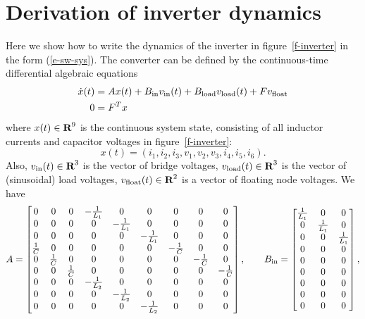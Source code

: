 \documentclass[12pt]{article}
\newcommand{\reals}{{\mbox{\bf R}}}
\begin{document}
\section{Derivation of inverter dynamics}
\label{s-inverter-derivation}
Here we show how to write the dynamics of the inverter in figure~\ref{f-inverter} 
in the form (\ref{e-sw-sys}).
The converter can be defined by the continuous-time differential algebraic equations
\begin{align*}
\dot x(t) &= A x(t) + B_{\rm in} v_{\rm in}(t)
+ B_{\rm load} v_{\rm load}(t) + Fv_{\rm float}
\\
0 &= F^T x
\end{align*}
where $x(t)\in\reals^9$ is the continuous system state,
consisting of all inductor currents and capacitor voltages in 
figure~\ref{f-inverter}:
\[
x(t) = (
i_1, i_2, i_3, v_1, v_2, v_3, i_4, i_5, i_6 ).
\]
Also, $v_{\rm in}(t)\in\reals^3$ is the vector of bridge voltages,
$v_{\rm load}(t)\in\reals^3$ is the vector of (sinusoidal) load voltages,
$v_{\rm float}(t) \in \reals^2$ is a vector of floating node voltages.
We have
\[
A = 
\begin{bmatrix} 
0 & 0 & 0 & -\frac1{L_1} & 0 & 0 & 0 & 0 & 0 \\
0 & 0 & 0 & 0 & -\frac1{L_1} & 0 & 0 & 0 & 0 \\
0 & 0 & 0 & 0 & 0 & -\frac1{L_1} & 0 & 0 & 0 \\
\frac1C & 0 & 0 & 0 & 0 & 0 & -\frac1C & 0 & 0 \\
0 & \frac1C & 0 & 0 & 0 & 0 & 0 & -\frac1C & 0 \\
0 & 0 & \frac1C & 0 & 0 & 0 & 0 & 0 & -\frac1C \\
0 & 0 & 0 & -\frac1{L_2} & 0 & 0 & 0 & 0 & 0 \\
0 & 0 & 0 & 0 & -\frac1{L_2} & 0 & 0 & 0 & 0 \\
0 & 0 & 0 & 0 & 0 & -\frac1{L_2} & 0 & 0 & 0 \\
\end{bmatrix},
\qquad
B_{\rm in} = 
\begin{bmatrix} 
\frac1{L_1} & 0 & 0 \\
0 & \frac1{L_1} & 0 \\
0 & 0 & \frac1{L_1} \\
0 & 0 & 0 \\
0 & 0 & 0 \\
0 & 0 & 0 \\
0 & 0 & 0 \\
0 & 0 & 0 \\
0 & 0 & 0 \\
\end{bmatrix},
\]
\end{document}
